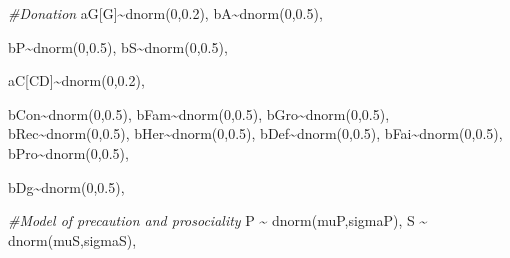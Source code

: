 \documentclass[
]{book}
\newenvironment{Shaded}{\begin{snugshade}}{\end{snugshade}}
\newcommand{\CommentTok}[1]{\textcolor[rgb]{0.56,0.35,0.01}{\textit{#1}}}
\newcommand{\DecValTok}[1]{\textcolor[rgb]{0.00,0.00,0.81}{#1}}
\newcommand{\FloatTok}[1]{\textcolor[rgb]{0.00,0.00,0.81}{#1}}
\newcommand{\FunctionTok}[1]{\textcolor[rgb]{0.00,0.00,0.00}{#1}}
\newcommand{\NormalTok}[1]{#1}
\newcommand{\SpecialCharTok}[1]{\textcolor[rgb]{0.00,0.00,0.00}{#1}}
\begin{document}
\begin{Shaded}
\begin{Highlighting}[]
    \CommentTok{\#Donation}
\NormalTok{    aG[G]}\SpecialCharTok{\textasciitilde{}}\FunctionTok{dnorm}\NormalTok{(}\DecValTok{0}\NormalTok{,}\FloatTok{0.2}\NormalTok{),}
\NormalTok{    bA}\SpecialCharTok{\textasciitilde{}}\FunctionTok{dnorm}\NormalTok{(}\DecValTok{0}\NormalTok{,}\FloatTok{0.5}\NormalTok{),}
    
\NormalTok{    bP}\SpecialCharTok{\textasciitilde{}}\FunctionTok{dnorm}\NormalTok{(}\DecValTok{0}\NormalTok{,}\FloatTok{0.5}\NormalTok{),}
\NormalTok{    bS}\SpecialCharTok{\textasciitilde{}}\FunctionTok{dnorm}\NormalTok{(}\DecValTok{0}\NormalTok{,}\FloatTok{0.5}\NormalTok{),}
    
\NormalTok{    aC[CD]}\SpecialCharTok{\textasciitilde{}}\FunctionTok{dnorm}\NormalTok{(}\DecValTok{0}\NormalTok{,}\FloatTok{0.2}\NormalTok{),}
    
\NormalTok{    bCon}\SpecialCharTok{\textasciitilde{}}\FunctionTok{dnorm}\NormalTok{(}\DecValTok{0}\NormalTok{,}\FloatTok{0.5}\NormalTok{),}
\NormalTok{    bFam}\SpecialCharTok{\textasciitilde{}}\FunctionTok{dnorm}\NormalTok{(}\DecValTok{0}\NormalTok{,}\FloatTok{0.5}\NormalTok{),}
\NormalTok{    bGro}\SpecialCharTok{\textasciitilde{}}\FunctionTok{dnorm}\NormalTok{(}\DecValTok{0}\NormalTok{,}\FloatTok{0.5}\NormalTok{),}
\NormalTok{    bRec}\SpecialCharTok{\textasciitilde{}}\FunctionTok{dnorm}\NormalTok{(}\DecValTok{0}\NormalTok{,}\FloatTok{0.5}\NormalTok{),}
\NormalTok{    bHer}\SpecialCharTok{\textasciitilde{}}\FunctionTok{dnorm}\NormalTok{(}\DecValTok{0}\NormalTok{,}\FloatTok{0.5}\NormalTok{),}
\NormalTok{    bDef}\SpecialCharTok{\textasciitilde{}}\FunctionTok{dnorm}\NormalTok{(}\DecValTok{0}\NormalTok{,}\FloatTok{0.5}\NormalTok{),}
\NormalTok{    bFai}\SpecialCharTok{\textasciitilde{}}\FunctionTok{dnorm}\NormalTok{(}\DecValTok{0}\NormalTok{,}\FloatTok{0.5}\NormalTok{),}
\NormalTok{    bPro}\SpecialCharTok{\textasciitilde{}}\FunctionTok{dnorm}\NormalTok{(}\DecValTok{0}\NormalTok{,}\FloatTok{0.5}\NormalTok{),}
    
\NormalTok{    bDg}\SpecialCharTok{\textasciitilde{}}\FunctionTok{dnorm}\NormalTok{(}\DecValTok{0}\NormalTok{,}\FloatTok{0.5}\NormalTok{),}
    
    
    \CommentTok{\#Model of precaution and prosociality}
\NormalTok{    P }\SpecialCharTok{\textasciitilde{}} \FunctionTok{dnorm}\NormalTok{(muP,sigmaP),}
\NormalTok{    S }\SpecialCharTok{\textasciitilde{}} \FunctionTok{dnorm}\NormalTok{(muS,sigmaS),}


\end{Highlighting}
\end{Shaded}
\end{document}
